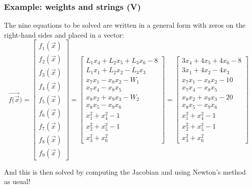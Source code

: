 \documentclass[hyperref={colorlinks=true}]{beamer}
\begin{document}
\begin{frame}%
  \frametitle{Example: weights and strings (V)}

  The nine equations to be solved are written in a general form with zeros on the right-hand sides and placed in a vector:
  \begin{equation}
    \vec{f(\vec{x}}) = \left[\begin{array}{c}
                      f_1(\vec{x}) \\
                      f_2(\vec{x}) \\
                      f_3(\vec{x}) \\
                      f_4(\vec{x}) \\
                      f_5(\vec{x}) \\
                      f_6(\vec{x}) \\
                      f_7(\vec{x}) \\
                      f_8(\vec{x}) \\
                      f_9(\vec{x})        
                    \end{array}\right]
             = \left[\begin{array}{c}
                       L_1 x_4 + L_2 x_5 + L_3 x_6 - 8 \\
                       L_1 x_1 + L_2 x_2 - L_3 x_3 \\
                       x_7 x_1 - x_8 x_2 - W_1 \\
                       x_7 x_4 - x_8 x_5 \\
                       x_8 x_2 + x_9 x_3 - W_2\\
                       x_8 x_5 - x_9 x_6 \\
                       x_1^2 + x_4^2 - 1 \\
                       x_2^2 + x_5^2 - 1 \\
                       x_3^2 + x_6^2 
                     \end{array}\right]  
             = \left[\begin{array}{c}
                       3x_4 + 4x_5 +4x_6 - 8 \\
                       3x_1 + 4x_2 - 4x_3 \\
                       x_7 x_1 - x_8 x_2 - 10 \\
                       x_7 x_4 - x_8 x_5 \\
                       x_8 x_2 + x_9 x_3 - 20 \\
                       x_8 x_5 - x_9 x_6 \\
                       x_1^2 + x_4^2 - 1 \\
                       x_2^2 + x_5^2 - 1 \\
                       x_3^2 + x_6^2 
                     \end{array}\right] \nonumber                 
  \end{equation}

  And this is then solved by computing the Jacobian and using Newton's method as usual!

\end{frame}


\end{document}
